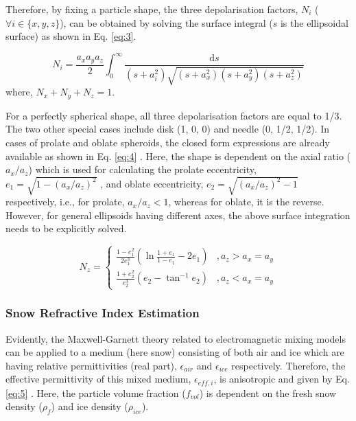 \documentclass[review]{elsarticle}
\numberwithin{equation}{section}
\numberwithin{figure}{section}
\numberwithin{table}{section}
\begin{document}
Therefore, by fixing a particle shape, the three depolarisation factors, $N_i$ ($\forall i \in \{x, y, z\}$), can be obtained by
solving the surface integral ($s$ is the ellipsoidal surface) as shown in Eq. \eqref{eq:3}.

\begin{equation}
    \label{eq:3}
	N_i =\frac{a_xa_ya_z}{2}\int_0^\infty\frac{\mathrm{d}s}{(s+a_i^2)\sqrt{(s+a_x^2)(s+a_y^2)(s+a_z^2)}}
\end{equation}
where, $N_x + N_y + N_z = 1$.

For a perfectly spherical shape, all three depolarisation factors are equal to 1/3. The two other special cases include disk (1, 0, 0) and needle (0, 1/2, 1/2). In cases of prolate and oblate spheroids, the closed form expressions are already available as shown in Eq. \eqref{eq:4} \citep{Sihvola1999}. Here, the shape is dependent on the axial ratio ($a_x/a_z$) which is used for calculating the prolate eccentricity, $e_1 = \sqrt{1 - (a_x/a_z)^2}$ , and oblate eccentricity, $e_2 = \sqrt{(a_x/a_z)^2 - 1}$ respectively, i.e., for prolate, $a_x/a_z < 1$, whereas for oblate, it
is the reverse. However, for general ellipsoids having different axes, the above surface integration needs to be explicitly solved.

\begin{equation}
    \label{eq:4}
	N_z = \begin{cases} 
          \frac{1 - e_1^2}{2e_1^3}\left(\ln{\frac{1 + e_1}{1 - e_1} - 2e_1}\right) &, a_z > a_x = a_y \\
          \frac{1 + e_2^2}{e_2^3}\left(e_2 - \tan^{-1}e_2\right) &, a_z < a_x = a_y
       \end{cases}
\end{equation}

\subsubsection{Snow Refractive Index Estimation}

Evidently, the Maxwell-Garnett theory related to electromagnetic mixing models can be applied to a medium (here snow) consisting of both air and ice which are having relative permittivities (real part), $\epsilon_{air}$ and $\epsilon_{ice}$ respectively. Therefore, the effective permittivity of this mixed medium, $\epsilon_{eff, i}$, is anisotropic and given by Eq. \eqref{eq:5} \citep{Leinss2014, Sihvola1999}. Here, the particle volume fraction ($f_{vol}$) is dependent on the fresh snow density ($\rho_f$) and ice density ($\rho_{ice}$). 
\end{document}
